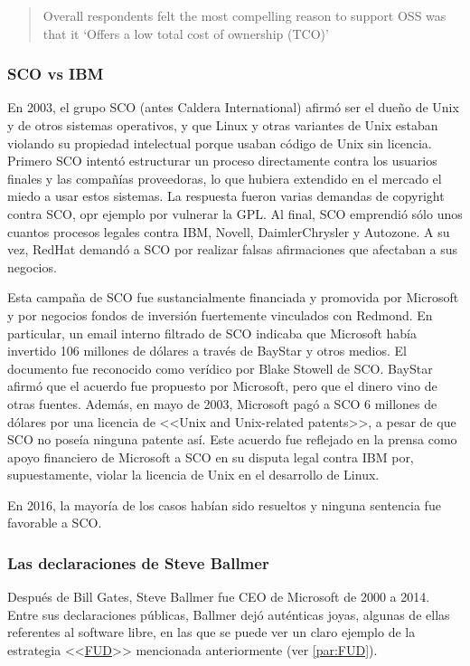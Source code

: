 \begin{quote}
    Overall respondents felt the most compelling reason to support OSS was that it `Offers a low total cost of ownership (TCO)'
\end{quote}

\subsubsection{SCO vs IBM}
En 2003, el grupo SCO (antes Caldera International) afirmó ser el dueño de Unix y de otros sistemas operativos, y que Linux y otras variantes de Unix estaban violando su propiedad intelectual porque usaban código de Unix sin licencia. Primero SCO intentó estructurar un proceso directamente contra los usuarios finales y las compañías proveedoras, lo que hubiera extendido en el mercado el miedo a usar estos sistemas. La respuesta fueron varias demandas de copyright contra SCO, opr ejemplo por vulnerar la GPL. Al final, SCO emprendió sólo unos cuantos procesos legales contra IBM, Novell, DaimlerChrysler y Autozone. A su vez, RedHat demandó a SCO por realizar falsas afirmaciones que afectaban a sus negocios. \cite{wiki_2019:sco_linux}

Esta campaña de SCO fue sustancialmente financiada y promovida por Microsoft y por negocios fondos de inversión fuertemente vinculados con Redmond. En particular, un email interno filtrado de SCO indicaba que Microsoft había invertido 106 millones de dólares a través de BayStar y otros medios. El documento fue reconocido como verídico por Blake Stowell de SCO. BayStar afirmó que el acuerdo fue propuesto por Microsoft, pero que el dinero vino de otras fuentes. Además, en mayo de 2003, Microsoft pagó a SCO 6 millones de dólares por una licencia de <<Unix and Unix-related patents>>, a pesar de que SCO no poseía ninguna patente así. Este acuerdo fue reflejado en la prensa como apoyo financiero de Microsoft a SCO en su disputa legal contra IBM por, supuestamente, violar la licencia de Unix en el desarrollo de Linux.\cite{wiki_2019:sco_linux_microsoft_controverse}

En 2016, la mayoría de los casos habían sido resueltos y ninguna sentencia fue favorable a SCO.\cite{wiki_2019:sco_linux}

\subsubsection{Las declaraciones de Steve Ballmer}
Después de Bill Gates, Steve Ballmer fue CEO de Microsoft de 2000 a 2014. Entre sus declaraciones públicas, Ballmer dejó auténticas joyas, algunas de ellas referentes al software libre, en las que se puede ver un claro ejemplo de la estrategia <<\href{https://en.wikipedia.org/wiki/Fear,_uncertainty,_and_doubt}{FUD}>> mencionada anteriormente (ver \ref{par:FUD}).

